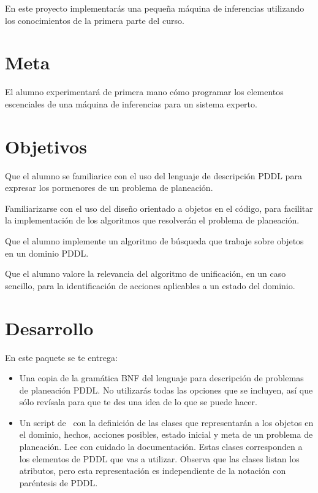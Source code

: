 
En este proyecto implementarás una pequeña máquina de inferencias utilizando los conocimientos
de la primera parte del curso.

\section{Meta}

El alumno experimentará de primera mano cómo programar los elementos escenciales de una
máquina de inferencias para un sistema experto.

\section{Objetivos}

\begin{compactitem}
 \item Que el alumno se familiarice con el uso del lenguaje de descripción PDDL para expresar
       los pormenores de un problema de planeación.
 \item Familiarizarse con el uso del diseño orientado a objetos en el código, para facilitar
       la implementación de los algoritmos que resolverán el problema de planeación.
 \item Que el alumno implemente un algoritmo de búsqueda que trabaje sobre objetos en un
       dominio PDDL.
 \item Que el alumno valore la relevancia del algoritmo de unificación, en un caso sencillo,
       para la identificación de acciones aplicables a un estado del dominio.
\end{compactitem}

\section{Desarrollo}

En este paquete se te entrega:
\begin{itemize}
 \item Una copia de la gramática BNF del lenguaje para descripción de problemas de planeación PDDL.
       No utilizarás todas las opciones que se incluyen, así que sólo revísala para que te des una 
       idea de lo que se puede hacer.
 \item Un script de \Python\ con la definición de las clases que representarán a los objetos en
       el dominio, hechos, acciones posibles, estado inicial y meta de un problema de planeación.
       Lee con cuidado la documentación.  Estas clases corresponden a los elementos de PDDL que
       vas a utilizar.  Observa que las clases listan los atributos, pero esta representación es
       independiente de la notación con paréntesis de PDDL.
\end{itemize}


